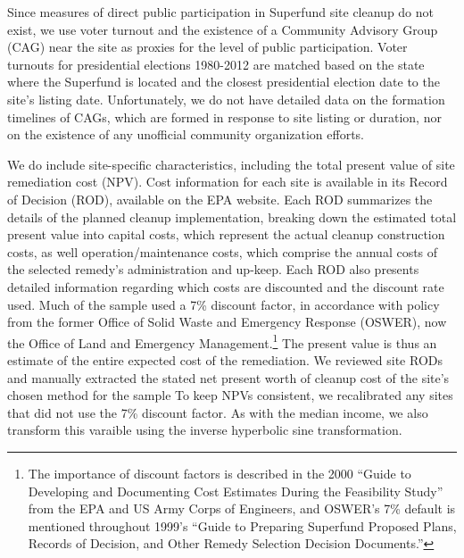\documentclass[12pt]{article}
\begin{document}
{Since measures of direct public participation in Superfund site cleanup do not exist, we use voter turnout and the existence of a Community Advisory Group (CAG) near the site as proxies for the level of public participation. Voter turnouts for presidential elections 1980-2012 are matched based on the state where the Superfund is located and the closest presidential election date to the site's listing date. Unfortunately, we do not have detailed data on the formation timelines of CAGs, which are formed in response to site listing or duration, nor on the existence of any unofficial community organization efforts.

We do include site-specific characteristics, including the total present value of site remediation cost (NPV). Cost information for each site is available in its Record of Decision (ROD), available on the EPA website. Each ROD summarizes the details of the planned cleanup implementation, breaking down the estimated total present value into capital costs, which represent the actual cleanup construction costs, as well operation/maintenance costs, which comprise the annual costs of the selected remedy's administration and up-keep. Each ROD also presents detailed information regarding which costs are discounted and the discount rate used. Much of the sample used a 7\% discount factor, in accordance with policy from the former Office of Solid Waste and Emergency Response (OSWER), now the Office of Land and Emergency Management.\footnote{The importance of discount factors is described in the 2000 ``Guide to Developing and Documenting Cost Estimates During the Feasibility Study'' from the EPA and US Army Corps of Engineers, and OSWER's 7\% default is mentioned throughout 1999's ``Guide to Preparing Superfund Proposed Plans, Records of Decision, and Other Remedy Selection Decision Documents.''} The present value is thus an estimate of the entire expected cost of the remediation. We reviewed site RODs and manually extracted the stated net present worth of cleanup cost of the site's chosen method for the sample {To keep NPVs consistent, we recalibrated any sites that did not use the 7\% discount factor.} As with the median income, we also transform this varaible using the inverse hyperbolic sine transformation.

}
\end{document}
